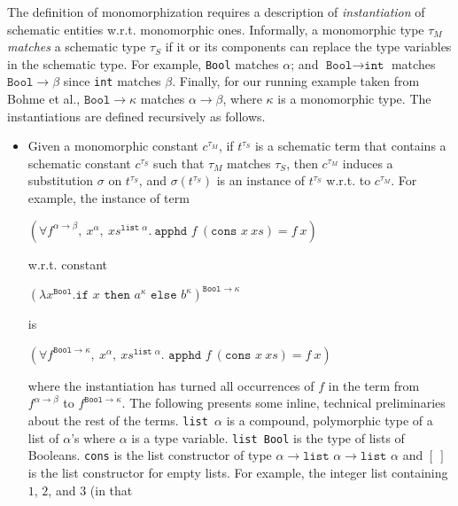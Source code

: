 \documentclass[11pt]{article}
\begin{document}
	The definition of monomorphization 
	requires a description of 
	\textit{instantiation} of schematic 
	entities w.r.t. 
	monomorphic ones.
	Informally, a monomorphic type 
	$\tau_M$ \textit{matches} a schematic 
	type $\tau_S$ if it or its components 
	can replace the 
	type variables in the schematic 
	type. For example, \texttt{Bool} 
	matches $\alpha$; and $\texttt{Bool} 
	\to \texttt{int}$ matches 
	$\texttt{Bool} \to \beta$
	since \texttt{int} matches 
	$\beta$. Finally, for our running 
	example taken from Bohme et al., 
	${\texttt{Bool} \to \kappa}$
	matches $\alpha \to \beta$,
	where $\kappa$ is a monomorphic
	type. The instantiations are 
	defined recursively as follows.
	\begin{itemize}
	\item Given a monomorphic constant 
		$c^{\tau_M}$,  if $t^{\tau_S}$ is a 
		schematic term that contains a 
		schematic constant $c^{\tau_S}$ 
		such that $\tau_M$ matches 
		$\tau_S$, then $c^{\tau_M}$ induces 
		a substitution $\sigma$ on $t^{\tau_S}$, 
		and $\sigma(t^{\tau_S})$ is an instance of 
		$t^{\tau_S}$ w.r.t. to $c^{\tau_M}$. 
		For example, the instance of term
		\begin{center}
			$(\forall f^{\alpha \to \beta},\ 
			x^{\alpha},\ xs^{\texttt{list }
				\alpha}.\ \texttt{apphd }f\ 
			(\texttt{cons }x\ xs) = f\ x)$
		\end{center} 
		w.r.t. constant
		\begin{center}
			$(\lambda x^{\texttt{Bool}}.
			\texttt{if }x\texttt{ then }
			a^{\kappa} \texttt{ else }
			b^{\kappa})^{\texttt{Bool} \to 
				\kappa}$ 
		\end{center}
		is
		\begin{center}
			$(\forall f^{\texttt{Bool} 
				\to \kappa},\ x^{\alpha},\ 
			xs^{\texttt{list }\alpha}. 
			\texttt{ apphd }f\ (\texttt{cons }
			x \ xs) = f\ x)$
		\end{center}
		where the instantiation 
		has turned all occurrences of $f$ 
		in the term from $f^{\alpha \to \beta}$ 
		to $f^{\texttt{Bool} \to \kappa}$.
		The following presents some inline, 
		technical preliminaries about 
		the rest of the terms.
		\texttt{list $\alpha$} is a compound,
		polymorphic type of a list of 
		$\alpha$'s where $\alpha$ is a type 
		variable. \texttt{list Bool} is the 
		type of lists of Booleans. \texttt{cons} 
		is the list constructor of type 
		$\alpha \to \texttt{list }\alpha \to 
		\texttt{list }\alpha$ and $[\ ]$ is 
		the list constructor for empty lists. 
		For example, the integer list 
		containing $1$, $2$, and $3$ (in that 

\end{itemize}
\end{document}
